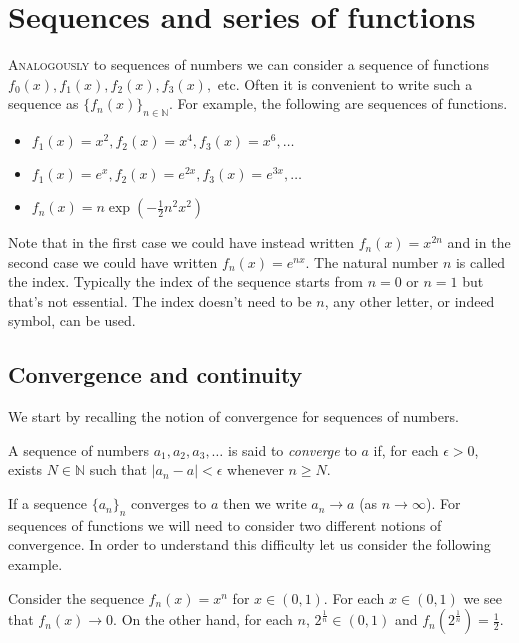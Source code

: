 
\chapter{Sequences and series of functions}

\lettrine{A}{nalogously} to sequences of numbers we can consider a sequence of functions \(f_0(x),f_1(x), f_2(x), f_3(x),\) etc.
Often it is convenient to write such a sequence as \(\{ f_n(x)\}_{n\in \mathbb{N}}\).
For example, the following are sequences of functions.
\begin{itemize}
  \item \(f_1(x) = x^2, f_2(x)=x^4, f_3(x)=x^6,\ldots \)
  \item \(f_1(x) = e^x, f_2(x)=e^{2x}, f_3(x)=e^{3x},\ldots \)
  \item \(f_n(x) = n \exp \left( - \frac{1}{2}n^2 x^2 \right)\)
\end{itemize}

Note that in the first case we could have instead written \(f_n(x) = x^{2n}\) and in the second case we could have written  \(f_n(x) = e^{nx}\).
The natural number \(n\) is called the index.
Typically the index of the sequence starts from \(n=0\) or \(n=1\) but that's not essential.
The index doesn't need to be \(n\), any other letter, or indeed symbol, can be used.


\section{Convergence and continuity}

We start by recalling the notion of convergence for sequences of numbers.

\begin{definition}
  A sequence of numbers  \(a_1, a_2, a_3,\ldots \) is said to \emph{converge} to \(a\) if, for each \(\epsilon>0\), exists \(N\in \mathbb{N}\) such that \(|a_n - a| < \epsilon\) whenever \(n\geq N\).
\end{definition}
%
\noindent
If a sequence \({\{a_n\}}_{n}\) converges to \(a\) then we write \(a_n \to a\) (as \(n\to \infty\)).
For sequences of functions we will need to consider two different notions of convergence.
In order to understand this difficulty let us consider the following example.

\begin{example*}
  Consider the sequence \(f_n(x) = x^n\) for \(x\in (0,1)\).
  For each \(x\in (0,1)\) we see that \(f_n(x) \to 0\).
  On the other hand, for each \(n\), \(2^{\frac{1}{n}}\in (0,1)\) and \(f_n(2^{\frac{1}{n}}) = \frac{1}{2}\).
\end{example*}


